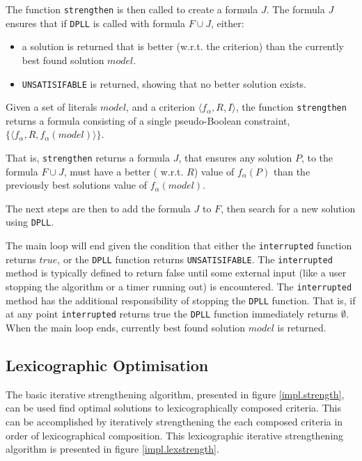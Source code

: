 The function \texttt{strengthen} is then called to create a formula $J$.
The formula $J$ ensures that if \texttt{DPLL} is called with formula $F \cup J$, either:
\begin{itemize}
  \item a solution is returned that is better (w.r.t. the criterion) than the currently best found solution $model$. 
  \item \texttt{UNSATISIFABLE} is returned, showing that no better solution exists.
\end{itemize}

\begin{defs}
Given a set of literals $model$, and a criterion $\langle f_{\alpha}, R, I \rangle$,
the function \texttt{strengthen} returns a formula consisting of a single pseudo-Boolean constraint, $\{ \langle f_{\alpha},R,f_{\alpha}(model) \rangle \}$.
\end{defs}
That is, \texttt{strengthen} returns a formula $J$,
that ensures any solution $P$, to the formula $F \cup J$, must have a better ( w.r.t. $R$) value of $f_{\alpha}(P)$ than the previously best solutions value of $f_{\alpha}(model)$.

The next steps are then to add the formula $J$ to $F$, then search for a new solution using \texttt{DPLL}.

The main loop will end given the condition that either the \texttt{interrupted} function returns $true$, or the \texttt{DPLL} function returns \texttt{UNSATISIFABLE}.
The \texttt{interrupted} method is typically defined to return false until some external input (like a user stopping the algorithm or a timer running out) is encountered.
The \texttt{interrupted} method has the additional responsibility of stopping the \texttt{DPLL} function.
That is, if at any point \texttt{interrupted} returns true the \texttt{DPLL} function immediately returns $\emptyset$.
When the main loop ends, currently best found solution $model$ is returned.

\subsection{Lexicographic Optimisation}
The basic iterative strengthening algorithm, presented in figure \ref{impl.strength}, can be used find optimal solutions to lexicographically composed criteria.
This can be accomplished by iteratively strengthening the each composed criteria in order of lexicographical composition.
This lexicographic iterative strengthening algorithm is presented in figure \ref{impl.lexstrength}.

